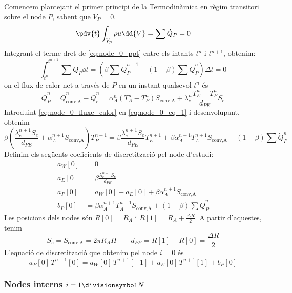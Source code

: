 Comencem plantejant el primer principi de la Termodinàmica en règim transitori sobre el node $P$, sabent que $V_P = 0$.
\begin{equation} \label{eq:node_0_ppt}
	\pdv{t} \int_{V_p} \rho u \dd{V} = \sum \dot{Q}_P = 0
\end{equation}
Integrant el terme dret de \ref{eq:node_0_ppt} entre els intants $t^n$ i $t^{n+1}$, obtenim:
\begin{equation} \label{eq:node_0_eq_1}
	\int_{t^{n}}^{t^{n+1}} \sum \dot{Q}_P \dd{t} =
	\left( \beta \sum \dot{Q}_P^{n+1} + (1 - \beta) \sum \dot{Q}_P^n \right) \Delta t = 0
\end{equation}
on el flux de calor net a través de $P$ en un instant qualsevol $t^n$ és
\begin{equation} \label{eq:node_0_fluxe_calor}
	\dot{Q}_P^n = 
	\dot{Q}_\text{conv,A}^n - \dot{Q}_e^n =
	\alpha_A^n \left( T_A^n - T_P^n \right) S_\text{conv,A} + \lambda_e^n \frac{T_E^n - T_P^n}{d_{PE}} S_e
\end{equation}
Introduint \eqref{eq:node_0_fluxe_calor} en \eqref{eq:node_0_eq_1} i desenvolupant, obtenim
\begin{equation}
	\beta \left( \frac{\lambda_e^{n+1} S_e}{d_{PE}} + \alpha_A^{n+1} S_\text{conv,A} \right) T_P^{n+1} = 
	\beta \frac{\lambda_e^{n+1} S_e}{d_{PE}} T_E^{n+1} + 
	\beta \alpha_A^{n+1} T_A^{n+1} S_\text{conv,A} + 
	\left( 1 - \beta \right) \sum \dot{Q}_P^n
\end{equation}
Definim els següents coeficients de discretització pel node d'estudi:
\begin{align}
	a_W[0] &= 0												\\
	a_E[0] &= \beta \frac{\lambda_e^{n+1} S_e}{d_{PE}} 		\\
	a_P[0] &= a_W[0] + a_E[0] + \beta \alpha_A^{n+1} S_\text{conv,A}  	\\
	b_P[0] &= \beta \alpha_A^{n+1} T_A^{n+1} S_\text{conv,A} + (1 - \beta) \sum \dot{Q}_P^n
\end{align}
Les posicions dels nodes són $R[0] = R_A$ i $R[1] = R_A + \frac{\Delta R}{2}$. A partir d'aquestes, tenim
\[
	S_e = S_\text{conv,A} = 2 \pi R_A H \qquad d_{PE} = R[1] - R[0] = \frac{\Delta R}{2}
\]
L'equació de discretització que obtenim pel node $i = 0$ és
\begin{equation}
	a_P[0] \, T^{n+1}[0] = a_W[0] \, T^{n+1}[-1] + a_E[0] \, T^{n+1}[1] + b_P[0]
\end{equation}

\clearpage

\subsubsection{Nodes interns $i = 1 \divisionsymbol N$}

